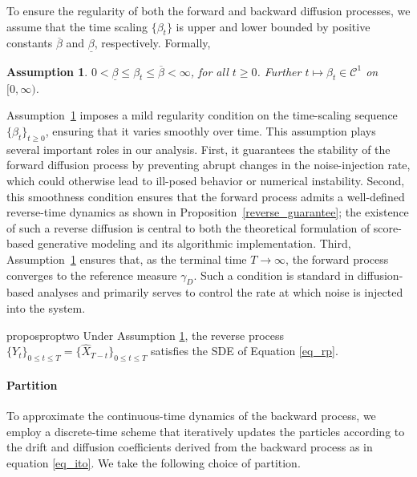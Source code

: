 \documentclass[12pts]{article}
\newtheorem{ass}{Assumption}
\newcommand{\sC}{ \mathscr{C}}
\newcommand{\hX}{ \widehat{X}}
\begin{document}
To ensure the regularity of both the forward and backward diffusion processes, we assume that the time scaling $\{\beta_t\}$ is upper and lower bounded by positive constants $\overline{\beta}$ and $\underline{\beta}$, respectively. Formally, 
  \begin{ass}\label{a1}
    $0 < \underline{\beta} \le \beta_t \le \overline{\beta} < \infty$, for all $t \ge 0$. Further $t\mapsto \beta_t \in \sC^1$ on $[0,\infty)$.
\end{ass}
Assumption~\ref{a1} imposes a mild regularity condition on the time-scaling sequence $\{\beta_t\}_{t \ge 0}$, ensuring that it varies smoothly over time. This assumption plays several important roles in our analysis. First, it guarantees the stability of the forward diffusion process by preventing abrupt changes in the noise-injection rate, which could otherwise lead to ill-posed behavior or numerical instability. Second, this smoothness condition ensures that the forward process admits a well-defined reverse-time dynamics as shown in Proposition~\ref{reverse_guarantee}; the existence of such a reverse diffusion is central to both the theoretical formulation of score-based generative modeling and its algorithmic implementation. Third, Assumption~\ref{a1} ensures that, as the terminal time $T \to \infty$, the forward process converges to the reference measure $\gamma_D$. Such a condition is standard in diffusion-based analyses and primarily serves to control the rate at which noise is injected into the system.  

 \begin{restatable}{propos}{proptwo}
    \label{reverse_guarantee}
Under Assumption \ref{a1},  the reverse process $\{Y_t\}_{0 \le t \le T} = \{\hX_{T-t}\}_{0 \le t \le T}$ satisfies the SDE of Equation \eqref{eq_rp}.
\end{restatable}
\paragraph{Partition} To approximate the continuous-time dynamics of the backward process, we employ a discrete-time scheme that iteratively updates the particles according to the drift and diffusion coefficients derived from the backward process as in equation \eqref{eq_ito}. We take the following choice of partition. 
\end{document}
